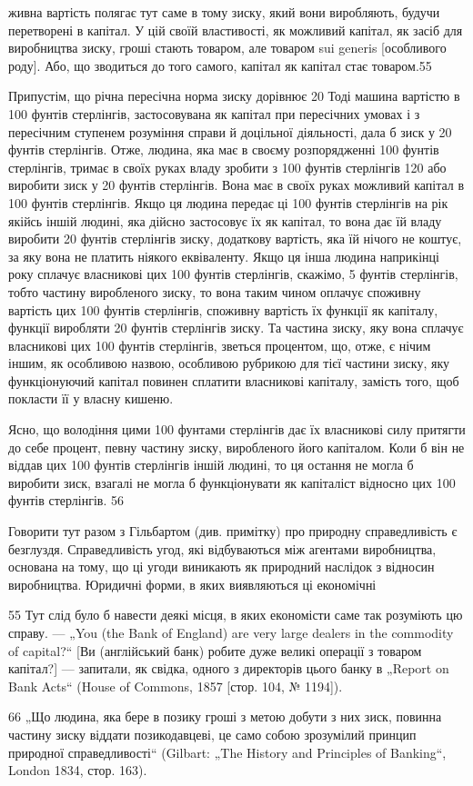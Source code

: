живна вартість полягає тут саме в тому зиску, який вони виробляють,
будучи перетворені в капітал. У цій своїй властивості,
як можливий капітал, як засіб для виробництва зиску, гроші
стають товаром, але товаром sui generis [особливого роду].
Або, що зводиться до того самого, капітал як капітал стає
товаром.55

Припустім, що річна пересічна норма зиску дорівнює 20%
Тоді машина вартістю в 100 фунтів стерлінгів, застосовувана
як капітал при пересічних умовах і з пересічним ступенем розуміння
справи й доцільної діяльності, дала б зиск у 20 фунтів
стерлінгів. Отже, людина, яка має в своєму розпорядженні
100 фунтів стерлінгів, тримає в своїх руках владу зробити
з 100 фунтів стерлінгів 120 або виробити зиск у 20 фунтів стерлінгів.
Вона має в своїх руках можливий капітал в 100 фунтів
стерлінгів. Якщо ця людина передає ці 100 фунтів стерлінгів
на рік якійсь іншій людині, яка дійсно застосовує їх як капітал,
то вона дає їй владу виробити 20 фунтів стерлінгів зиску, додаткову
вартість, яка їй нічого не коштує, за яку вона не платить
ніякого еквіваленту. Якщо ця інша людина наприкінці
року сплачує власникові цих 100 фунтів стерлінгів, скажімо,
5 фунтів стерлінгів, тобто частину виробленого зиску, то вона
таким чином оплачує споживну вартість цих 100 фунтів стерлінгів,
споживну вартість їх функції як капіталу, функції виробляти
20 фунтів стерлінгів зиску. Та частина зиску, яку вона
сплачує власникові цих 100 фунтів стерлінгів, зветься процентом,
що, отже, є нічим іншим, як особливою назвою, особливою
рубрикою для тієї частини зиску, яку функціонуючий капітал
повинен сплатити власникові капіталу, замість того, щоб покласти
її у власну кишеню.

Ясно, що володіння цими 100 фунтами стерлінгів дає їх
власникові силу притягти до себе процент, певну частину
зиску, виробленого його капіталом. Коли б він не віддав цих
100 фунтів стерлінгів іншій людині, то ця остання не могла б
виробити зиск, взагалі не могла б функціонувати як капіталіст
відносно цих 100 фунтів стерлінгів. 56

Говорити тут разом з Гільбартом (див. примітку) про природну
справедливість є безглуздя. Справедливість угод, які
відбуваються між агентами виробництва, основана на тому, що
ці угоди виникають як природний наслідок з відносин виробництва.
Юридичні форми, в яких виявляються ці економічні

55    Тут слід було б навести деякі місця, в яких економісти саме так розуміють
цю справу. — „You (the Bank of England) are very large dealers in the
commodity of capital?“ [Ви (англійський банк) робите дуже великі операції
з товаром капітал?] — запитали, як свідка, одного з директорів цього банку
в „Report on Bank Acts“ (House of Commons, 1857 [стор. 104, № 1194]).

66 „Що людина, яка бере в позику гроші з метою добути з них зиск, повинна
частину зиску віддати позикодавцеві, це само собою зрозумілий принцип
природної справедливості“ (Gilbart: „The History and Principles of Banking“,
London 1834, стор. 163).
